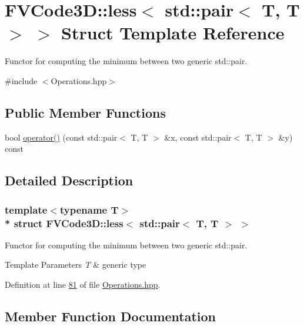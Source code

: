 \hypertarget{structFVCode3D_1_1less_3_01std_1_1pair_3_01T_00_01T_01_4_01_4}{}\section{F\+V\+Code3D\+:\+:less$<$ std\+:\+:pair$<$ T, T $>$ $>$ Struct Template Reference}
\label{structFVCode3D_1_1less_3_01std_1_1pair_3_01T_00_01T_01_4_01_4}


Functor for computing the minimum between two generic std\+::pair.  




{\ttfamily \#include $<$Operations.\+hpp$>$}

\subsection*{Public Member Functions}
\begin{DoxyCompactItemize}
\item 
bool \hyperlink{structFVCode3D_1_1less_3_01std_1_1pair_3_01T_00_01T_01_4_01_4_ad4272c44f7983a96b87dd01f12379dde}{operator()} (const std\+::pair$<$ T, T $>$ \&x, const std\+::pair$<$ T, T $>$ \&y) const 
\end{DoxyCompactItemize}


\subsection{Detailed Description}
\subsubsection*{template$<$typename T$>$\\*
struct F\+V\+Code3\+D\+::less$<$ std\+::pair$<$ T, T $>$ $>$}

Functor for computing the minimum between two generic std\+::pair. 


\begin{DoxyTemplParams}{Template Parameters}
{\em T} & generic type \\
\hline
\end{DoxyTemplParams}


Definition at line \hyperlink{Operations_8hpp_source_l00081}{81} of file \hyperlink{Operations_8hpp_source}{Operations.\+hpp}.



\subsection{Member Function Documentation}
